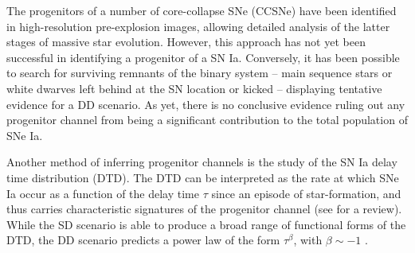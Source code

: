 \documentclass[fleqn,usenatbib]{mnras}
\begin{document}
The progenitors of a number of core-collapse SNe (CCSNe) have been identified in high-resolution pre-explosion images, allowing detailed analysis of the latter stages of massive star evolution. However, this approach has not yet been successful in identifying a progenitor of a SN Ia. Conversely, it has been possible to search for surviving remnants of the binary system -- main sequence stars or white dwarves left behind at the SN location or kicked \citep{Shen2018} -- displaying tentative evidence for a DD scenario. As yet, there is no conclusive evidence ruling out any progenitor channel from being a significant contribution to the total population of SNe Ia.

Another method of inferring progenitor channels is the study of the SN Ia delay time distribution (DTD). The DTD can be interpreted as the rate at which SNe Ia occur as a function of the delay time $\tau$ since an episode of star-formation, and thus carries characteristic signatures of the progenitor channel (see \citealt{Wang2012} for a review). While the SD scenario is able to produce a broad range of functional forms of the DTD, the DD scenario predicts a power law of the form $\tau^{\beta}$, with $\beta \sim -1$ \citep[e.g][]{Ruiter2009,Mennekens2010}.
\end{document}
